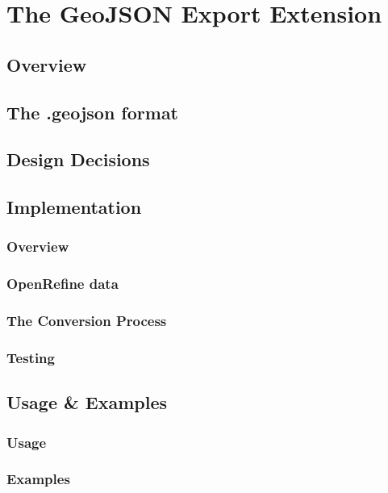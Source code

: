 \chapter{The GeoJSON Export Extension}

\section{Overview}
\lipsum[3-6]

\section{The .geojson format}
\lipsum[13-16]

\section{Design Decisions}
\lipsum[7-8]

\section{Implementation}
\subsection{Overview}
\lipsum[9-11]
\subsection{OpenRefine data}
\lipsum[12-14]
\subsection{The Conversion Process}
\lipsum[15-17]
\subsection{Testing}
\lipsum[18-20]

\section{Usage \& Examples}
\lipsum[9-10]
\subsection{Usage}
\lipsum[18-20]
\subsection{Examples}
\lipsum[3-4]